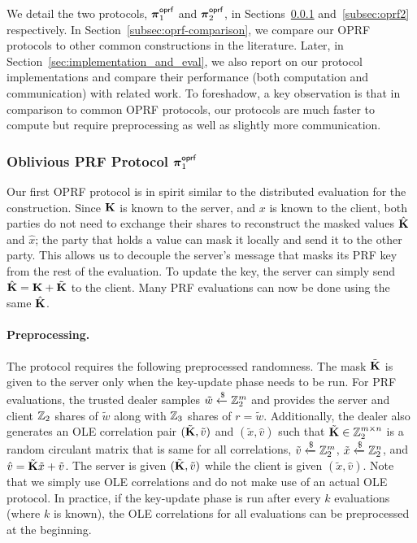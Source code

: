 We detail the two protocols, $\boldsymbol{\pi}^{\textsf{oprf}}_1$ and $\boldsymbol{\pi}^{\textsf{oprf}}_2$, in Sections~\ref{subsec:oprf1} and~\ref{subsec:oprf2} respectively. In Section~\ref{subsec:oprf-comparison}, we compare our OPRF protocols to other common constructions in the literature. Later, in Section~\ref{sec:implementation_and_eval}, we also report on our protocol implementations and compare their performance (both computation and communication) with related work. To foreshadow, a key observation is that in comparison to common OPRF protocols, our protocols are much faster to compute but require preprocessing as well as slightly more communication.


\subsubsection{Oblivious PRF Protocol $\boldsymbol{\pi}^{\textsf{oprf}}_1$}
\label{subsec:oprf1}
Our first OPRF protocol is in spirit similar to the distributed evaluation for the \ttwPRF construction. Since $\mat{K}$ is known to the server, and $x$ is known to the client, both parties do not need to exchange their shares to reconstruct the masked values $\hat{\mat{K}}$ and $\hat{x}$; the party that holds a value can mask it locally and send it to the other party. This allows us to decouple the server's message that masks its PRF key from the rest of the evaluation. To update the key, the server can simply send $\hat{\mat{K}} = \mat{K} + \tilde{\mat{K}}$ to the client. Many PRF evaluations can now be done using the same $\hat{\mat{K}}$.

\paragraph{Preprocessing.} The protocol requires the following preprocessed randomness. The mask $\tilde{\mat{K}}$ is given to the server only when the key-update phase needs to be run. For PRF evaluations, the trusted dealer samples $\tilde{w} \xleftarrow{\$} \mathbb{Z}_2^m$ and provides the server and client $\mathbb{Z}_2$ shares of $\tilde{w}$ along with $\mathbb{Z}_3$ shares of $r = \tilde{w}$. Additionally, the dealer also generates an OLE correlation pair $(\tilde{\mat{K}}, \tilde{v})$ and $(\tilde{x}, \hat{v})$ such that $\tilde{\mat{K}} \in \Z_2^{m \times n}$ is a random circulant matrix that is same for all correlations, $\tilde{v} \xleftarrow{\$} \mathbb{Z}_2^m$, $\tilde{x} \xleftarrow{\$} \mathbb{Z}_2^n$, and $\hat{v} = \tilde{\mat{K}}\tilde{x} + \tilde{v}$. The server is given $(\tilde{\mat{K}}, \tilde{v})$ while the client is given $(\tilde{x}, \hat{v})$. Note that we simply use OLE correlations and do not make use of an actual OLE protocol. In practice, if the key-update phase is run after every $k$ evaluations (where $k$ is known), the OLE correlations for all evaluations can be preprocessed at the beginning. 

